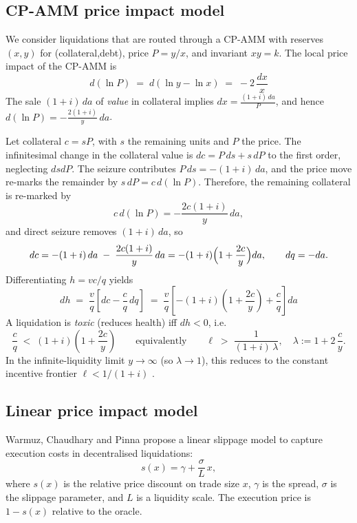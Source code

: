 \documentclass[11pt]{article}
\begin{document}
\subsection{CP-AMM price impact model}
We consider liquidations that are routed through a CP-AMM with reserves \((x,y)\) for (collateral,debt), price \(P=y/x\), and invariant \(xy=k\). The local price impact of the CP-AMM is
\begin{equation}
d(\ln P) \;=\; d(\ln y - \ln x) \;=\; -2\,\frac{dx}{x}
\label{eq:cp-impact}
\end{equation}
The sale \((1+i)\,da\) of \emph{value} in collateral implies \(dx = \frac{(1+i)\,da}{P}\), and hence \(d(\ln P) = -\frac{2(1+i)}{y}\,da\).

Let collateral $c=sP$, with $s$ the remaining units and $P$ the price. The infinitesimal change in the collateral value is $dc = P\,ds + s\,dP$ to the first order, neglecting $dsdP$. The seizure contributes $P\,ds=-(1+i)\,da$, and the price move re-marks the remainder by $s\,dP=c\,d(\ln P)$. Therefore, the remaining collateral is re-marked by
\[
c\,d(\ln P) = -\frac{2c(1+i)}{y}\,da,
\]
and direct seizure removes \((1+i)\,da\), so
\[
dc = - (1+i)\,da \;-\; \frac{2c(1+i)}{y}\,da
= -(1+i)\Bigl(1+\frac{2c}{y}\Bigr)da,
\qquad dq=-da.
\]
Differentiating \(h = v c/q\) yields
\[
dh \;=\; \frac{v}{q}\!\left[dc - \frac{c}{q}\,dq\right]
\;=\; \frac{v}{q}\!\left[-(1+i)\!\left(1+\frac{2c}{y}\right) + \frac{c}{q}\right]\!da
\]
A liquidation is \emph{toxic} (reduces health) iff \(dh<0\), i.e.
\begin{equation}
\frac{c}{q} \;<\; (1+i)\!\left(1+\frac{2c}{y}\right)
\qquad\text{equivalently}\qquad
\ell \;>\; \frac{1}{(1+i)\,\lambda},
\quad \lambda := 1 + 2\,\frac{c}{y}.
\label{eq:constant-bonus}
\end{equation}
In the infinite-liquidity limit \(y\to\infty\) (so \(\lambda\to 1\)), this reduces to the constant incentive frontier \(\ell < 1/(1+i)\) \cite{WCP2022}.

\subsection{Linear price impact model}
Warmuz, Chaudhary and Pinna \cite{WCP2022} propose a linear slippage model to capture execution costs in decentralised liquidations:
\[
s(x) = \gamma + \frac{\sigma}{L}\,x,
\]
where $s(x)$ is the relative price discount on trade size $x$, $\gamma$ is the spread, $\sigma$ is the slippage parameter, and $L$ is a liquidity scale. The execution price is $1-s(x)$ relative to the oracle.
\end{document}
